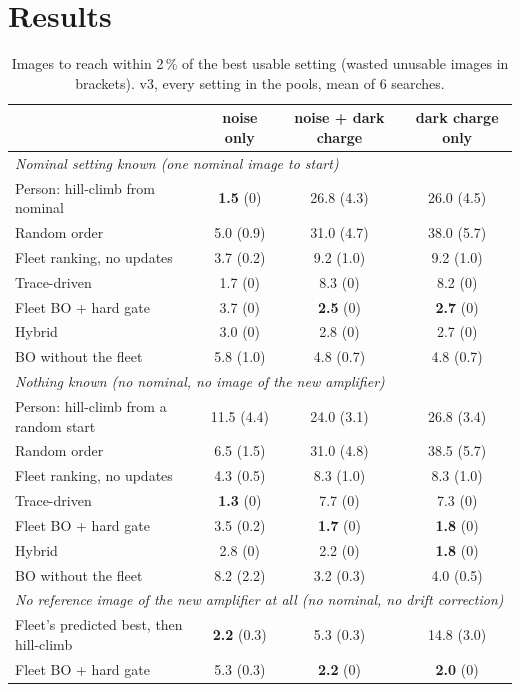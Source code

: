 \documentclass[11pt]{article}
\begin{document}
\section{Results}\label{sec:results}
\begin{table}[H]\centering\small
\caption{Images to reach within 2\,\% of the best usable setting (wasted unusable images in brackets). v3, every setting in
the pools, mean of 6 searches.}
\begin{tabular}{lccc}\toprule
 & noise only & noise + dark charge & dark charge only\\\midrule
\multicolumn{4}{l}{\textit{Nominal setting known (one nominal image to start)}}\\
Person: hill-climb from nominal & \textbf{1.5} (0) & 26.8 (4.3) & 26.0 (4.5)\\
Random order & 5.0 (0.9) & 31.0 (4.7) & 38.0 (5.7)\\
Fleet ranking, no updates & 3.7 (0.2) & 9.2 (1.0) & 9.2 (1.0)\\
Trace-driven & 1.7 (0) & 8.3 (0) & 8.2 (0)\\
Fleet BO + hard gate & 3.7 (0) & \textbf{2.5} (0) & \textbf{2.7} (0)\\
Hybrid & 3.0 (0) & 2.8 (0) & 2.7 (0)\\
BO without the fleet & 5.8 (1.0) & 4.8 (0.7) & 4.8 (0.7)\\\midrule
\multicolumn{4}{l}{\textit{Nothing known (no nominal, no image of the new amplifier)}}\\
Person: hill-climb from a random start & 11.5 (4.4) & 24.0 (3.1) & 26.8 (3.4)\\
Random order & 6.5 (1.5) & 31.0 (4.8) & 38.5 (5.7)\\
Fleet ranking, no updates & 4.3 (0.5) & 8.3 (1.0) & 8.3 (1.0)\\
Trace-driven & \textbf{1.3} (0) & 7.7 (0) & 7.3 (0)\\
Fleet BO + hard gate & 3.5 (0.2) & \textbf{1.7} (0) & \textbf{1.8} (0)\\
Hybrid & 2.8 (0) & 2.2 (0) & \textbf{1.8} (0)\\
BO without the fleet & 8.2 (2.2) & 3.2 (0.3) & 4.0 (0.5)\\\midrule
\multicolumn{4}{l}{\textit{No reference image of the new amplifier at all (no nominal, no drift correction)}}\\
Fleet's predicted best, then hill-climb & \textbf{2.2} (0.3) & 5.3 (0.3) & 14.8 (3.0)\\
Fleet BO + hard gate & 5.3 (0.3) & \textbf{2.2} (0) & \textbf{2.0} (0)\\\bottomrule
\end{tabular}\end{table}
\end{document}
